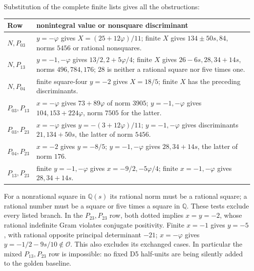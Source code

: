 \documentclass[11pt]{article}
\begin{document}
Substitution of the complete finite lists gives all the obstructions:
\begin{center}\small
\begin{tabular}{lp{.72\linewidth}}\toprule
Row&nonintegral value or nonsquare discriminant\\ \midrule
$N,P_{03}$&$y=-\varphi$ gives $X=(25+12\varphi)/11$;
finite $X$ gives $134\pm50s,84$, norms $5456$ or rational nonsquares.\\
$N,P_{13}$&$y=-1,-\varphi$ gives $13/2,2+5\varphi/4$;
finite $X$ gives $26-6s,28,34+14s$, norms $496,784,176$;
$28$ is neither a rational square nor five times one.\\
$N,P_{04}$&finite square-four $y=-2$ gives $X=18/5$;
finite $X$ has the preceding discriminants.\\
$P_{03},P_{13}$&$x=-\varphi$ gives $73+89\varphi$ of norm $3905$;
$y=-1,-\varphi$ gives $104,153+224\varphi$, norm $7505$ for the latter.\\
$P_{03},P_{23}$&$x=-\varphi$ gives $y=-(3+12\varphi)/11$;
$y=-1,-\varphi$ gives discriminants $21,134+50s$, the latter of norm $5456$.\\
$P_{04},P_{23}$&$x=-2$ gives $y=-8/5$; $y=-1,-\varphi$
gives $28,34+14s$, the latter of norm $176$.\\
$P_{13},P_{23}$&finite $y=-1,-\varphi$ gives $x=-9/2,-5\varphi/4$;
finite $x=-1,-\varphi$ gives $28,34+14s$.\\ \bottomrule
\end{tabular}\end{center}
For a nonrational square in $\mathbb Q(s)$ its rational norm must
be a rational square; a rational number must be a square or five
times a square in $\mathbb Q$. These tests exclude every listed
branch. In the $P_{23},P_{23}$ row, both dotted implies $x=y=-2$,
whose rational indefinite Gram violates conjugate positivity.
Finite $x=-1$ gives $y=-5$, with rational opposite principal
 determinant $-21$; $x=-\varphi$ gives $y=-1/2-9s/10\notin\mathcal O$.
This also excludes its exchanged cases. In particular the mixed
$P_{13},P_{23}$ row is impossible: no fixed D5 half-units are being
silently added to the golden baseline.
\end{document}

